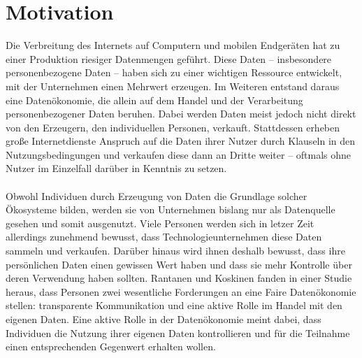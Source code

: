 \section{Motivation}

Die Verbreitung des Internets auf Computern und mobilen Endgeräten hat zu einer Produktion riesiger Datenmengen geführt. Diese Daten -- insbesondere personenbezogene Daten -- haben sich zu einer wichtigen Ressource entwickelt, mit der Unternehmen einen Mehrwert erzeugen. Im Weiteren entstand daraus eine Datenökonomie, die allein auf dem Handel und der Verarbeitung personenbezogener Daten beruhen. \cite{humanDemand_2020} Dabei werden Daten meist jedoch nicht direkt von den Erzeugern, den individuellen Personen, verkauft. Stattdessen erheben große Internetdienste Anspruch auf die Daten ihrer Nutzer durch Klauseln in den Nutzungsbedingungen und verkaufen diese dann an Dritte weiter -- oftmals ohne Nutzer im Einzelfall darüber in Kenntnis zu setzen. \cite{monetizingData_2016}
\\
\\
Obwohl Individuen durch Erzeugung von Daten die Grundlage solcher Ökosysteme bilden, werden sie von Unternehmen bislang nur als Datenquelle gesehen und somit ausgenutzt. Viele Personen werden sich in letzer Zeit allerdings zunehmend bewusst, dass Technologieunternehmen diese Daten sammeln und verkaufen. Darüber hinaus wird ihnen deshalb bewusst, dass ihre persönlichen Daten einen gewissen Wert haben und dass sie mehr Kontrolle über deren Verwendung haben sollten. Rantanen und Koskinen fanden in einer Studie heraus, dass Personen zwei wesentliche Forderungen an eine Faire Datenökonomie stellen: transparente Kommunikation und eine aktive Rolle im Handel mit den eigenen Daten. Eine aktive Rolle in der Datenökonomie meint dabei, dass Individuen die Nutzung ihrer eigenen Daten kontrollieren und für die Teilnahme einen entsprechenden Gegenwert erhalten wollen. \cite{humanDemand_2020}
